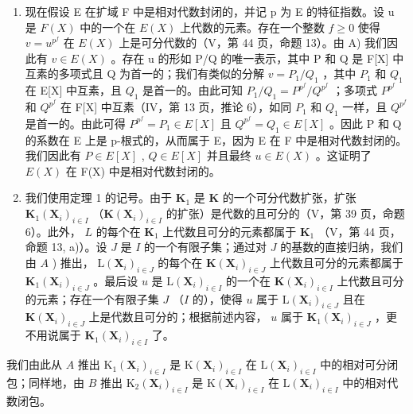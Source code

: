\begin{enumerate}
\def\labelenumi{\Alph{enumi})}
\setcounter{enumi}{1}
\item
  现在假设 E 在扩域 F 中是相对代数封闭的，并记 p 为 E 的特征指数。设 u 是 \(F(X)\) 中的一个在 \(E(X)\) 上代数的元素。存在一个整数 \(f \geqslant 0\) 使得 \(v = u^{p^f}\) 在 \(E(X)\) 上是可分代数的（V，第 44 页，命题 13）。由 A) 我们因此有 \(v \in E(X)\) 。存在 u 的形如 P/Q 的唯一表示，其中 P 和 Q 是 F{[}X{]} 中互素的多项式且 Q 为首一的；我们有类似的分解 \(v = P_1 / Q_1\) ，其中 \(P_1\) 和 \(Q_1\) 在 E{[}X{]} 中互素，且 \(Q_1\) 是首一的。由此可知 \(P_1 / Q_1 = P^{p^f} / Q^{p^f}\) ；多项式 \(P^{p^f}\) 和 \(Q^{p^f}\) 在 F{[}X{]} 中互素（IV，第 13 页，推论 6），如同 \(P_1\) 和 \(Q_1\) 一样，且 \(Q^{p^f}\) 是首一的。由此可得 \(P^{p^f} = P_1 \in E[X]\) 且 \(Q^{p^f} = Q_1 \in E[X]\) 。因此 P 和 Q 的系数在 E 上是 p-根式的，从而属于 E，因为 E 在 F 中是相对代数封闭的。我们因此有 \(P \in E[X]\) , \(Q \in E[X]\) 并且最终 \(u \in E(X)\) 。这证明了 \(E(X)\) 在 F(X) 中是相对代数封闭的。
\item
  我们使用定理 1 的记号。由于 \(\mathbf{K}_1\) 是 \(\mathbf{K}\) 的一个可分代数扩张，扩张 \(\mathbf{K}_1(\mathbf{X}_i)_{i\in I}\) （\(\mathbf{K}(\mathbf{X}_i)_{i\in I}\) 的扩张）是代数的且可分的（V，第 39 页，命题 6）。此外， \(L\) 的每个在 \(\mathbf{K}_1\) 上代数且可分的元素都属于 \(\mathbf{K}_1\) （V，第 44 页，命题 13, a)）。设 \(J\) 是 \(I\) 的一个有限子集；通过对 \(J\) 的基数的直接归纳，我们由 \(A\) ) 推出， \(\mathrm{L}(\mathbf{X}_i)_{i\in J}\) 的每个在 \(\mathbf{K}(\mathbf{X}_i)_{i\in J}\) 上代数且可分的元素都属于 \(\mathbf{K}_1(\mathbf{X}_i)_{i\in J}\) 。最后设 \(u\) 是 \(\mathrm{L}(\mathbf{X}_i)_{i\in I}\) 的一个在 \(\mathbf{K}(\mathbf{X}_i)_{i\in I}\) 上代数且可分的元素；存在一个有限子集 \(J\) （\(I\) 的），使得 \(u\) 属于 \(\mathrm{L}(\mathbf{X}_i)_{i\in J}\) 且在 \(\mathbf{K}(\mathbf{X}_i)_{i\in J}\) 上是代数且可分的；根据前述内容， \(u\) 属于 \(\mathbf{K}_1(\mathbf{X}_i)_{i\in J}\) ，更不用说属于 \(\mathbf{K}_1(\mathbf{X}_i)_{i\in I}\) 了。
\end{enumerate}

我们由此从 \(A\) 推出 \(\mathrm{K}_1(\mathbf{X}_i)_{i\in I}\) 是 \(\mathrm{K}(\mathbf{X}_i)_{i\in I}\) 在 \(\mathrm{L}(\mathbf{X}_i)_{i\in I}\) 中的相对可分闭包；同样地，由 \(B\) 推出 \(\mathrm{K}_2(\mathbf{X}_i)_{i\in I}\) 是 \(\mathrm{K}(\mathbf{X}_i)_{i\in I}\) 在 \(\mathrm{L}(\mathbf{X}_i)_{i\in I}\) 中的相对代数闭包。

